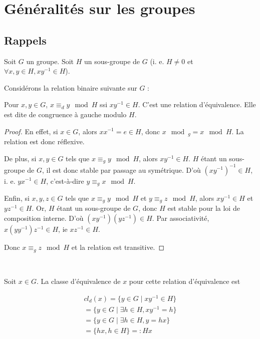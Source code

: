 \documentclass[french]{book}
\title{\bsc{Théorie des représentations}}
\date{2023-2024}
\author{Yves \bsc{Aubry}, M-147A, yves.aubry@univ-tln.fr}
\begin{document}
\maketitle

\tableofcontents

\chapter{Généralités sur les groupes}

\section{Rappels}


Soit $G$ un groupe. Soit $H$ un sous-groupe de $G$ (i. e. $H \neq 0$ et $\forall x, y \in H, x y ^{-1} \in H$).

Considérons la relation binaire suivante sur $G$ :

Pour $x, y \in G$, $x \equiv _{d} y \mod H$ ssi $x y ^{-1} \in H$. C'est une relation d'équivalence. Elle est dite de congruence à gauche modulo $H$.

\begin{proof}
  En effet, si $x \in G$, alors $x x ^{-1} = e \in H$, donc $x \mod _{g} = x \mod H$. La relation est donc réflexive.

  De plus, si $x, y \in G$ tels que $x \equiv _{g} y \mod H$, alors $x y ^{-1} \in H$. $H$ étant un sous-groupe de $G$, il est donc stable par passage au symétrique. D'où $(x y ^{-1} ) ^{-1}  \in H$, i. e. $y x ^{-1} \in H$, c'est-à-dire $y \equiv _{g} x \mod H$.

  Enfin, si $x, y,z \in G$ tels que $x \equiv _{g} y \mod H$ et $y \equiv _{g} z \mod H$, alors $x y ^{-1} \in H$ et $yz ^{-1} \in H$. Or, $H$ étant un sous-groupe de $G$, donc $H$ est stable pour la loi de composition interne. D'où $(x y ^{-1} )(y z ^{-1} ) \in H$. Par associativité, $x (y y ^{-1} ) z ^{-1}  \in H$, ie $x z ^{-1}  \in H$.

  Donc $x \equiv _{g} z \mod H $ et la relation est transitive.
\end{proof}

\

Soit $x \in G$. La classe d'équivalence de $x$ pour cette relation d'équivalence est

\begin{gather*}
  cl _{d}(x) = \{ y \in G \mid x y ^{-1} \in H \} \\
  = \{ y \in G \mid \exists h \in H, x y ^{-1} = h \} \\
  = \{ y \in G \mid \exists h \in H, y = hx \} \\
  = \{ hx, h \in H \} =: Hx
\end{gather*}
\end{document}
